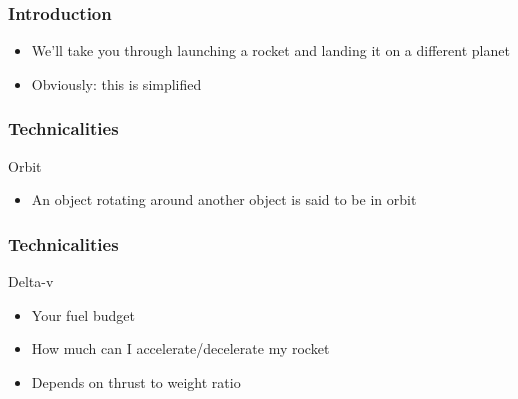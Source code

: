 \begin{frame}
    \frametitle{Introduction}
    \begin{block}{}
        \begin{itemize}
            \item We'll take you through launching a rocket and landing it on a different planet
            \item Obviously: this is simplified
        \end{itemize}
    \end{block}
\end{frame}
\begin{frame}
    \frametitle{Technicalities}
    \begin{block}{Orbit}
        \begin{itemize}
            \item An object rotating around another object is said to be in orbit
        \end{itemize}
    \end{block}
\end{frame}
\begin{frame}
    \frametitle{Technicalities}
    \begin{block}{Delta-v}
        \begin{itemize}
            \item Your fuel budget
            \item How much can I accelerate/decelerate my rocket
            \item Depends on thrust to weight ratio
        \end{itemize}
    \end{block}
\end{frame}
